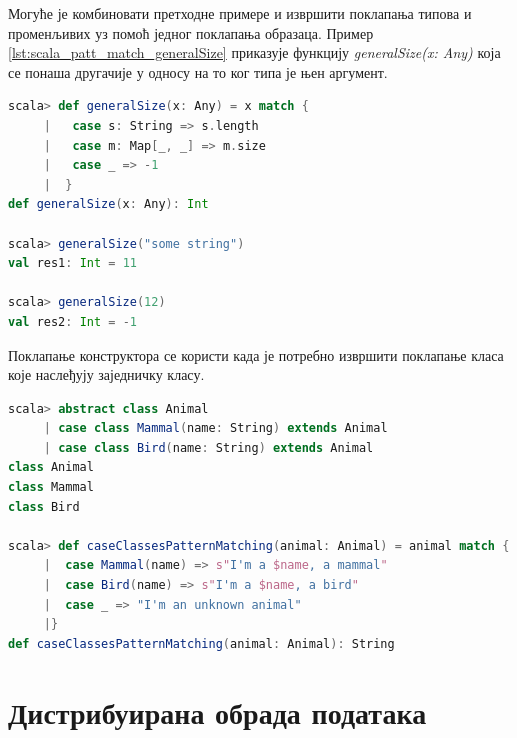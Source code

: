 \documentclass[12pt,oneside]{memoir}
\begin{document}
Могуће је комбиновати претходне примере и извршити поклапања типова и променљивих уз помоћ једног поклапања образаца. Пример \ref{lst:scala_patt_match_generalSize} приказује функцију \textit{generalSize(x: Any)} која се понаша другачије у односу на то ког типа је њен аргумент. \cite{scala_prog}

\begin{lstlisting}[language=Scala, caption={Пример поклапања типова и променљивих}, label={lst:scala_patt_match_generalSize}]
scala> def generalSize(x: Any) = x match {
     |   case s: String => s.length
     |   case m: Map[_, _] => m.size
     |   case _ => -1
     |  }
def generalSize(x: Any): Int

scala> generalSize("some string")
val res1: Int = 11

scala> generalSize(12)
val res2: Int = -1
\end{lstlisting}

Поклапање конструктора се користи када је потребно извршити поклапање класа које наслеђују заједничку класу. 

\begin{lstlisting}[language=Scala, caption={Поклапање конструктора}, label={lst:scala_patt_match_constr_match_example}]
scala> abstract class Animal
     | case class Mammal(name: String) extends Animal
     | case class Bird(name: String) extends Animal
class Animal
class Mammal
class Bird

scala> def caseClassesPatternMatching(animal: Animal) = animal match {
     |  case Mammal(name) => s"I'm a $name, a mammal"
     |  case Bird(name) => s"I'm a $name, a bird"
     |  case _ => "I'm an unknown animal"
     |}
def caseClassesPatternMatching(animal: Animal): String
\end{lstlisting}



\chapter{Дистрибуирана обрада података}
\label{chp:dist_sis}
\end{document}
